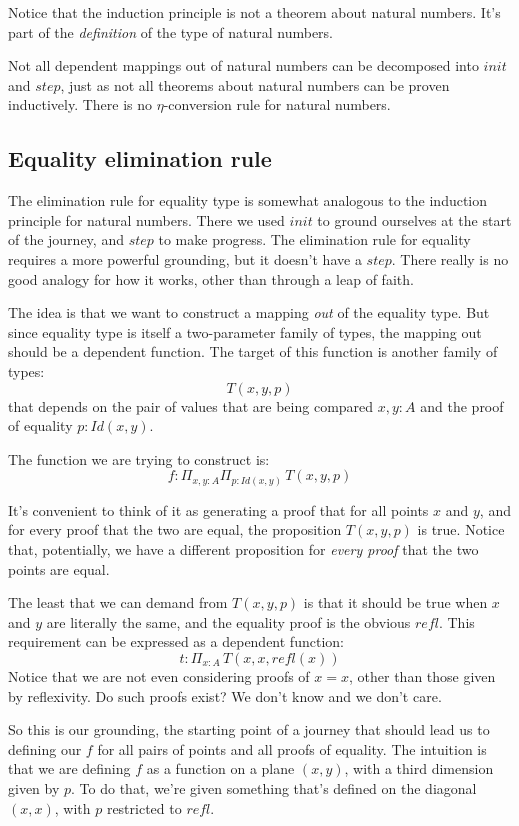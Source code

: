 \documentclass[DaoFP]{subfiles}
\begin{document}
Notice that the induction principle is not a theorem about natural numbers. It's part of the \emph{definition} of the type of natural numbers. 

Not all dependent mappings out of natural numbers can be decomposed into $\mathit{init}$ and $\mathit{step}$, just as not all theorems about natural numbers can be proven inductively. There is no $\eta$-conversion rule for natural numbers.

\subsection{Equality elimination rule}

The elimination rule for equality type is somewhat analogous to the induction principle for natural numbers. There we used $\mathit{init}$ to ground ourselves at the start of the journey, and $\mathit{step}$ to make progress. The elimination rule for equality requires a more powerful grounding, but it doesn't have a $\mathit{step}$. There really is no good analogy for how it works, other than through a leap of faith.

The idea is that we want to construct a mapping \emph{out} of the equality type. But since equality type is itself a two-parameter family of types, the mapping out should be a dependent function. The target of this function is another family of types:
\[T(x, y, p)\]
 that depends on the pair of values that are being compared $x, y \colon A$ and the proof of equality $p \colon \mathit{Id}(x, y)$.
 
 The function we are trying to construct is:
 \[ f \colon \Pi_{x, y : A} \Pi_{p : \mathit{Id}(x, y)} \, T(x, y, p) \]

It's convenient to think of it as generating a proof that for all points $x$ and $y$, and for every proof that the two are equal, the proposition $T(x, y, p)$ is true. Notice that, potentially, we have a different proposition for \emph{every proof} that the two points are equal.

The least that we can demand from $T(x, y, p)$ is that it should be true when $x$ and $y$ are literally the same, and the equality proof is the obvious $\mathit{refl}$. This requirement can be expressed as a dependent function:
\[t \colon \Pi_{x : A} \,T\left(x, x, \mathit{refl}(x)\right)\]
Notice that we are not even considering proofs of $x = x$, other than those given by reflexivity. Do such proofs exist? We don't know and we don't care.

So this is our grounding, the starting point of a journey that should lead us to defining our $f$ for all pairs of points and all proofs of equality. The intuition is that we are defining $f$ as a function on a plane $(x, y)$, with a third dimension given by $p$. To do that, we're given something that's defined on the diagonal $(x, x)$, with $p$ restricted to $\mathit{refl}$.
\end{document}

